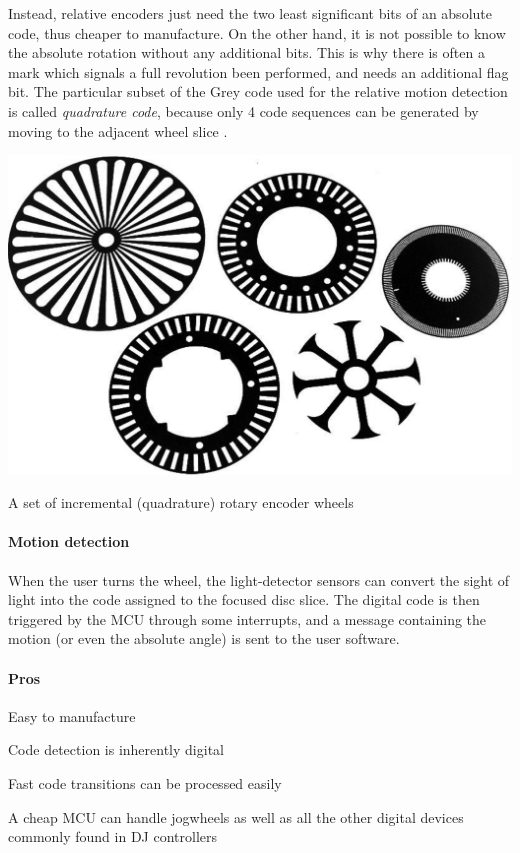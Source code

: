 \documentclass[a4paper,10pt]{article}
\makeatletter
\newenvironment{figurehere}{\def\@captype{figure}\vspace{2ex}}{\vspace{2ex}}
\makeatother
\begin{document}
\begin{multicols}{2}
Instead, relative encoders just need the two least significant bits of an
absolute code, thus cheaper to manufacture. On the other hand, it is not
possible to know the absolute rotation without any additional bits. This is
why there is often a mark which signals a full revolution been performed, and
needs an additional flag bit. The particular subset of the Grey code used for
the relative motion detection is called \emph{quadrature code}, because only 4
code sequences can be generated by moving to the adjacent wheel slice \CITEME.

\begin{figurehere}
	\label{fig:encoder_wheels}
	\centering
	\includegraphics[keepaspectratio=true,width=0.9\columnwidth]{images/encoder_wheels.pdf}
	\caption{A set of incremental (quadrature) rotary encoder wheels}
\end{figurehere}


\paragraph{Motion detection}
When the user turns the wheel, the light-detector sensors can convert the
sight of light into the code assigned to the focused disc slice. The digital
code is then triggered by the MCU through some interrupts, and a message
containing the motion (or even the absolute angle) is sent to the user
software.

\paragraph{Pros}
\begin{itemize*}
	\item Easy to manufacture
	\item Code detection is inherently digital
	\item Fast code transitions can be processed easily
	\item A cheap MCU can handle jogwheels as well as all the other digital
		devices commonly found in DJ controllers
\end{itemize*}



\end{multicols}
\end{document}
